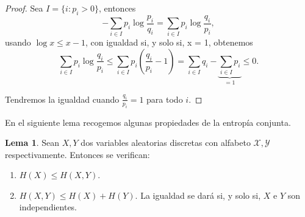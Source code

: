 \documentclass[10pt,a4paper]{article} %
\theoremstyle{definition}
\newtheorem{lemma}[theorem]{Lema}
\begin{document}
\begin{proof}
  Sea $I = \{i : p_i > 0\}$, entonces\[
- \sum_{i \in I} p_i \log \frac{p_i}{q_i} = \sum_{i \in I} p_i \log \frac{q_i}{p_i},
  \]
  usando $\log x \le x - 1$, con igualdad si, y solo si, x = 1, obtenemos\[
  \sum_{i \in I} p_i \log \frac{q_i}{p_i} \leq
  \sum_{i\in I}p_i \left ( \frac{q_i}{p_i} - 1 \right )
  = \sum_{i\in I}q_i - \underbrace{\sum_{i \in I}p_i}_{= 1} \leq 0.\]

  Tendremos la igualdad cuando $\frac{q_i}{p_i} = 1$ para todo $i$.
\end{proof}

En el siguiente lema recogemos algunas propiedades de la entropía conjunta.

\begin{lemma}\label{l:prop_ent_conj} Sean $X, Y$ dos variables aleatorias discretas con alfabeto $\mathcal{X}, \mathcal{Y}$ respectivamente. Entonces se verifican:
  \begin{enumerate}
  \item $H(X) \le H(X, Y)$.
  \item $H(X,Y) \le H(X) + H(Y)$. La igualdad se dará si, y solo si, $X$ e $Y$ son independientes.
  \end{enumerate}
\end{lemma}
\end{document}
